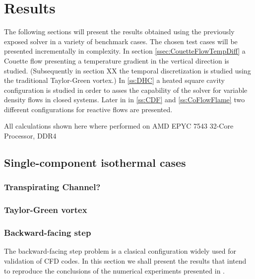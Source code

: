 \chapter{Results}	\label{ch:results}
\glsresetall
The following sections will present the results obtained using the previously exposed solver in a variety of benchmark cases.
The chosen test cases will be presented incrementally in complexity. In section \cref{ssec:CouetteFlowTempDiff} a Couette flow presenting a temperature gradient in the vertical direction is studied. 
(Subsequently in section XX the temporal discretization is studied using the traditional Taylor-Green vortex.)
In \cref{ss:DHC} a heated square cavity configuration is studied in order to asses the capability of the solver for variable density flows in closed systems. Later in in \cref{ss:CDF} and \cref{ss:CoFlowFlame} two different configurations for reactive flows are presented. 

All calculations shown here where performed on AMD EPYC 7543 32-Core Processor, DDR4 %





\section{Single-component isothermal cases}
\subsection{ Transpirating Channel?}	
\blindtext[5]
\subsection{ Taylor-Green vortex}
\blindtext[5]



\subsection{Backward-facing step}\label{ssec:BackwardFacingStep}
The backward-facing step problem is a clasical configuration widely used for validation of CFD codes.%
In this section we shall present the results that intend to reproduce the conclusions of the numerical experiments presented in \cite{biswasBackwardFacingStepFlows2004}.

